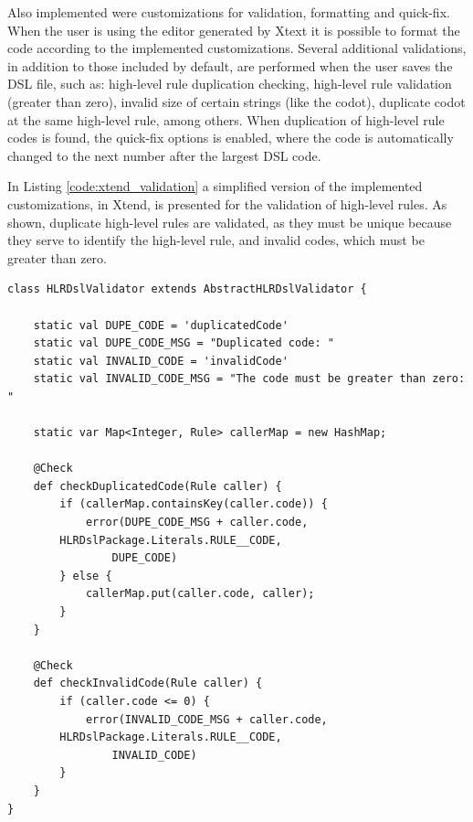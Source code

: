\documentclass[twocolumn]{bmcart}%
\begin{document}
Also implemented were customizations for validation, formatting and quick-fix. When the user is using the editor generated by Xtext it is possible to format the code according to the implemented customizations. Several additional validations, in addition to those included by default, are performed when the user saves the DSL file, such as: high-level rule duplication checking, high-level rule validation (greater than zero), invalid size of certain strings (like the codot), duplicate codot at the same high-level rule, among others. When duplication of high-level rule codes is found, the quick-fix options is enabled, where the code is automatically changed to the next number after the largest DSL code.



In Listing \ref{code:xtend_validation} a simplified version of the implemented customizations, in Xtend, is presented for the validation of high-level rules. %
As shown, duplicate high-level rules are validated, as they must be unique because they serve to identify the high-level rule, and invalid codes, which must be greater than zero.

\begin{small}
\begin{lstlisting}[frame=single, language=Xtend, caption={\it Validation Customization}, label={code:xtend_validation}]
class HLRDslValidator extends AbstractHLRDslValidator {

	static val DUPE_CODE = 'duplicatedCode'
	static val DUPE_CODE_MSG = "Duplicated code: "
	static val INVALID_CODE = 'invalidCode'
	static val INVALID_CODE_MSG = "The code must be greater than zero: "
	
	static var Map<Integer, Rule> callerMap = new HashMap;

	@Check
	def checkDuplicatedCode(Rule caller) {
		if (callerMap.containsKey(caller.code)) {
			error(DUPE_CODE_MSG + caller.code, 
        HLRDslPackage.Literals.RULE__CODE, 
				DUPE_CODE)
		} else {
			callerMap.put(caller.code, caller);
		}
	}

	@Check
	def checkInvalidCode(Rule caller) {
		if (caller.code <= 0) {
			error(INVALID_CODE_MSG + caller.code, 
        HLRDslPackage.Literals.RULE__CODE,
				INVALID_CODE)
		}
	}
}	
\end{lstlisting}
\end{small}
\end{document}
